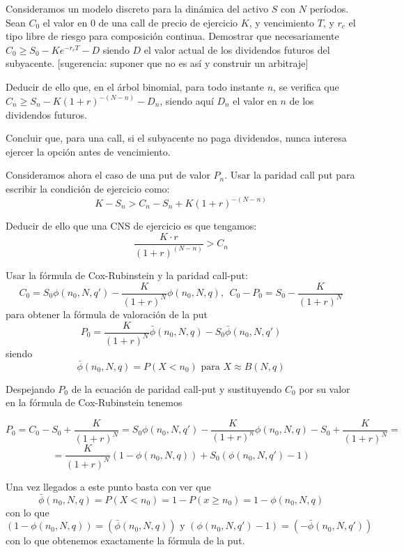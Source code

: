 \begin{problem}[5]
Consideramos un modelo discreto para la dinámica del activo $S$ con $N$ períodos. Sean $C_0$ el valor en 0 de una call de precio de ejercicio $K$, y vencimiento $T$, y $r_c$ el tipo libre de riesgo para composición continua.
\ppart Demostrar que necesariamente $C_0\geq S_0-Ke^{-r_cT}-D$ siendo $D$ el valor actual de los dividendos futuros del subyacente. [sugerencia: suponer que no es así y construir un arbitraje]

\ppart Deducir de ello que, en el árbol binomial, para todo instante $n$, se verifica que $C_n\geq S_n-K(1+r)^{-(N-n)}-D_n$, siendo aquí $D_n$ el valor en $n$ de los dividendos futuros.

\ppart Concluir que, para una call, si el subyacente no paga dividendos, nunca interesa ejercer la opción antes de vencimiento.

\ppart Consideramos ahora el caso de una put de valor $P_n$. Usar la paridad call put para escribir la condición de ejercicio como:
\[K-S_n > C_n-S_n + K(1+r)^{-(N-n)}\]

\ppart Deducir de ello que una CNS de ejercicio es que tengamos:
\[\frac{K\cdot r}{(1+r)^{(N-n)}}> C_n\]
\solution

\end{problem}

\begin{problem}[6]
Usar la fórmula de Cox-Rubinstein y la paridad call-put:
\[C_0=S_0 \phi(n_0,N,q')-\frac{K}{(1+r)^N}\phi(n_0,N,q), \ \ C_0-P_0=S_0-\frac{K}{(1+r)^N}\]
para obtener la fórmula de valoración de la put
\[P_0=\frac{K}{(1+r)^N}\bar{\phi}(n_0,N,q)-S_0\bar{\phi}(n_0,N,q')\]
siendo
\[\bar{\phi}(n_0,N,q)=P(X<n_0) \text{ para } X \approx B(N,q)\]
\solution
{}

Despejando $P_0$ de la ecuación de paridad call-put y sustituyendo $C_0$ por su valor en la fórmula de Cox-Rubinstein tenemos

\[P_0 = C_0-S_0+\frac{K}{(1+r)^N} = S_0 \phi(n_0,N,q')-\frac{K}{(1+r)^n}\phi(n_0,N,q)- S_0 + \frac{K}{(1+r)^N} =\]
\[ = \frac{K}{(1+r)^N}\left(1-\phi(n_0,N,q) \right) + S_0\left(\phi(n_0,N,q') -1\right)\]

Una vez llegados a este punto basta con ver que
\[\bar{\phi}(n_0,N,q) = P(X<n_0) = 1- P(x \geq n_0) = 1-\phi(n_0,N,q)\]
con lo que
\[\left(1-\phi(n_0,N,q) \right) = \left(\bar{\phi}(n_0,N,q) \right) \text{ y } \left(\phi(n_0,N,q') -1\right) = \left(-\bar{\phi}(n_0,N,q') \right)\]
con lo que obtenemos exactamente la fórmula de la put.
\end{problem}